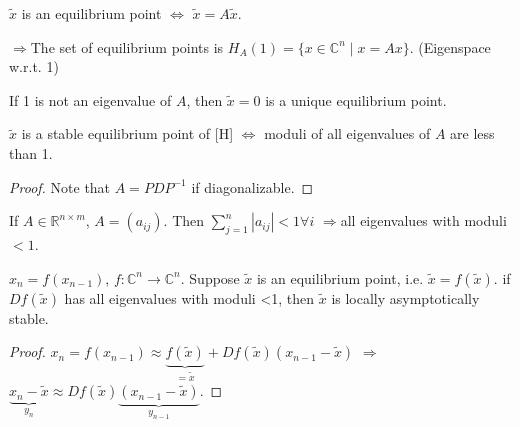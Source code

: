 \documentclass[twoside]{article}
\newcommand\imp{$\Longrightarrow$}
\begin{document}
$\tilde{x}$ is an equilibrium point $\iff$ $\tilde{x} = A\tilde{x}$.

\imp The set of equilibrium points is $H_{A}(1) = \{x \in \mathbb{C}^{n} \mid x = Ax\}$. (Eigenspace w.r.t. 1)

If 1 is not an eigenvalue of $A$, then $\tilde{x} = 0$ is a unique equilibrium point.

\begin{theorem}
    $\tilde{x}$ is a stable equilibrium point of [H] $\iff$ moduli of all eigenvalues of $A$ are less than 1.
\end{theorem}
\begin{proof}
    Note that $A = P D P^{-1}$ if diagonalizable.
\end{proof}

\begin{theorem}
    If $A \in \mathbb{R}^{n\times m}$, $A = (a_{ij}).$ Then $\sum_{j=1}^{n} |a_{ij}| < 1 \forall i$ \imp all eigenvalues with moduli $<1$. 
\end{theorem}

\begin{theorem}
    $x_n = f(x_{n-1})$, $f : \mathbb{C}^{n} \to \mathbb{C}^{n}$. Suppose $\tilde{x}$ is an equilibrium point, i.e. $\tilde{x} = f(\tilde{x}) $. if $Df(\tilde{x})$ has all eigenvalues with moduli <1, then $\tilde{x}$ is locally asymptotically stable.
\end{theorem}
\begin{proof}
    $x_{n} = f(x_{n-1}) \approx \underbrace{f(\tilde{x})}_{ = \tilde{x}} + Df(\tilde{x}) (x_{n-1} - \tilde{x}) $ \imp 
    $ \underbrace{x_{n} - \tilde{x}}_{y_{n}} \approx Df(\tilde{x}) \underbrace{(x_{n-1} - \tilde{x})}_{y_{n-1}} $.
\end{proof}












\end{document}
